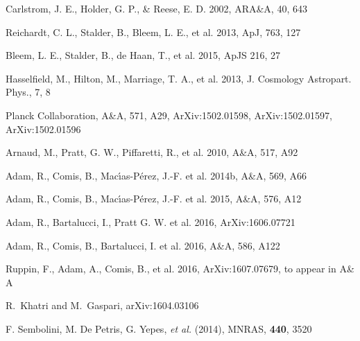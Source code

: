 \documentclass[11pt,a4paper,twoside,graphicx,color]{article}
\begin{document}
\begin{thebibliography}{99}
  {\small Carlstrom, J. E., Holder, G. P., \& Reese, E. D. 2002, ARA\&A, 40, 643}
   
   {\small Reichardt, C. L., Stalder, B., Bleem, L. E., et al. 2013, ApJ, 763, 127}
   
   {\small Bleem, L. E., Stalder, B., de Haan, T., et al. 2015, ApJS 216, 27}
   
   {\small Hasselfield, M., Hilton, M., Marriage, T. A., et al. 2013, J. Cosmology Astropart. Phys., 7, 8}
   
   {\small Planck Collaboration, A\&A, 571, A29, ArXiv:1502.01598, ArXiv:1502.01597, ArXiv:1502.01596}
 
    {\small Arnaud, M., Pratt, G. W., Piffaretti, R., et al. 2010, A\&A, 517, A92}
  
   {\small Adam, R., Comis, B., Mac{\'{\i}}as-P{\'e}rez, J.-F. et al. 2014b, A\&A, 569, A66}
 
   {\small Adam, R., Comis, B., Mac{\'{\i}}as-P{\'e}rez, J.-F. et al. 2015, A\&A, 576, A12}
   
 {\small Adam, R., Bartalucci, I., Pratt G. W. et al. 2016, ArXiv:1606.07721}
 
   {\small Adam, R., Comis, B., Bartalucci, I. et al. 2016, A\&A, 586, A122}
   
   {Ruppin, F., Adam, A., Comis, B., et al. 2016, ArXiv:1607.07679, to appear in A\& A}

  R.~Khatri and M.~Gaspari, arXiv:1604.03106  
   
  F. Sembolini, M. De Petris, G. Yepes, {\it et al.} (2014), MNRAS, \textbf{440}, 3520
  

\end{thebibliography}

 
 
\end{document}
